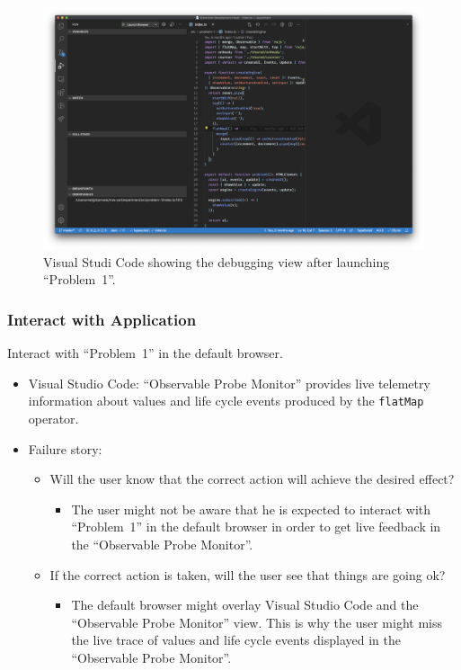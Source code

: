 \documentclass[sigplan,screen,nonacm,review]{acmart}
\begin{document}
\begin{figure}[ht]
	\centering
	\includegraphics[width=\columnwidth]{walkthrough-screenshots/step6.png}
	\Description{}
	\caption{Visual Studi Code showing the debugging view after launching ``Problem~1''.}
	\label{fig:walkthrough-screesnhot-step-6}
\end{figure}

\subsubsection{Interact with Application}
Interact with ``Problem~1'' in the default browser.

\begin{itemize}
	\item Visual Studio Code: ``Observable Probe Monitor'' provides live telemetry information about values and life cycle events produced by the \texttt{flatMap} operator.
	\item Failure story:
	      \begin{itemize}
	      	\item Will the user know that the correct action will achieve the desired effect?
	      	      \begin{itemize}
	      	      	\item The user might not be aware that he is expected to interact with ``Problem~1'' in the default browser in order to get live feedback in the ``Observable Probe Monitor''.
	      	      \end{itemize}
	      	\item If the correct action is taken, will the user see that things are going ok?
	      	      \begin{itemize}
	      	      	\item The default browser might overlay Visual Studio Code and the ``Observable Probe Monitor'' view. This is why the user might miss the live trace of values and life cycle events displayed in the ``Observable Probe Monitor''.
	      	      \end{itemize}
	      \end{itemize}
\end{itemize}
\end{document}
